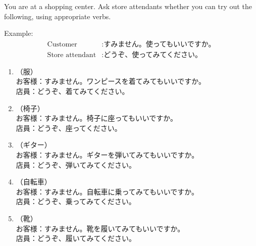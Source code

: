 \documentclass[notoc,notitlepage]{tufte-book}
\begin{document}
\begin{ex}
  You are at a shopping center. Ask store attendants whether you can try out the following, using appropriate verbs.

  Example:
  \begin{align*}
    \text{Customer} &: \text{すみません。使ってもいいですか。} \\
    \text{Store attendant} &: \text{どうぞ、使ってみてください。}
  \end{align*}

  \begin{enumerate}
    \item （服）\\
      お客様：すみません。ワンピースを着てみてもいいですか。\\
      店員：どうぞ、着てみてください。
    \item （椅子）\\
      お客様：すみません。椅子に座ってもいいですか。\\
      店員：どうぞ、座ってください。
    \item （ギター）\\
      お客様：すみません。ギターを弾いてみてもいいですか。\\
      店員：どうぞ、弾いてみてください。
    \item （自転車）\\
      お客様：すみません。自転車に乗ってみてもいいですか。\\
      店員：どうぞ、乗ってみてください。
    \item （靴）\\
      お客様：すみません。靴を履いてみてもいいですか。\\
      店員：どうぞ、履いてみてください。
  \end{enumerate}
\end{ex}
\end{document}

